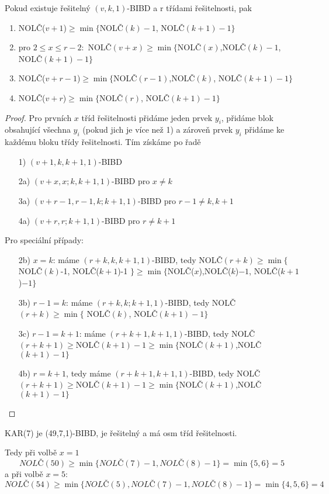\begin{theorem}
    Pokud existuje řešitelný $(v,k,1)$-BIBD a r třídami řešitelnosti, pak
    \begin{enumerate}
        \item NOLČ($v+1$)$\geq\min\{$NOLČ$(k)-1$, NOLČ$(k+1)-1\}$
        \item pro $2\leq x\leq r-2:$ NOLČ$(v+x)\geq\min\{$NOLČ$(x)$,NOLČ$(k)-1$, NOLČ$(k+1)-1\}$
        \item NOLČ($v+r-1$)$\geq\min\{$NOLČ$(r-1)$,NOLČ$(k)$, NOLČ$(k+1)-1\}$
        \item NOLČ($v+r$)$\geq\min\{$NOLČ$(r)$, NOLČ$(k+1)-1\}$
    \end{enumerate}
\end{theorem}
\begin{proof}
    Pro prvních $x$ tříd řešitelnosti přidáme jeden prvek $y_i$, přidáme blok obsahující všechna $y_i$ (pokud jich je více než 1) a zároveň prvek $y_i$ přidáme ke každému bloku  třídy řešitelnosti.
    Tím získáme po řadě
    \begin{itemize}
        \item[1)] $(v+1,k,k+1,1)$-BIBD
        \item[2a)] $(v+x,x;k,k+1,1)$-BIBD pro $x\neq k$
        \item[3a)] $(v+r-1, r-1, k;k+1,1)$-BIBD pro $r-1\neq k, k+1$
        \item[4a)] $(v+r, r; k+1, 1)$-BIBD pro $r\neq k+1$
    \end{itemize}
    Pro speciální případy:
    \begin{itemize}
        \item[2b)] $x=k$: máme $(r+k,k,k+1,1)$-BIBD, tedy NOLČ$(r+k)$$\geq\min\{$ NOLČ$(k)$-1, NOLČ($k+1$)-1 $\}\geq\min\{$NOLČ($x$),NOLČ($k$)$-1$, NOLČ($k+1$)$-1\}$
        \item[3b)] $r-1=k$: máme $(r+k, k;k+1,1)$-BIBD, tedy NOLČ$(r+k)\geq\min\{$ NOLČ$(k)$, NOLČ$(k+1)-1\}$
        \item[3c)] $r-1=k+1$: máme $(r+k+1,k+1,1)$-BIBD, tedy NOLČ$(r+k+1)\geq$NOLČ$(k+1)-1\geq\min\{$NOLČ$(k+1)$,NOLČ$(k+1)-1\}$
        \item[4b)] $r=k+1$, tedy máme $(r+k+1, k+1,1)$-BIBD, tedy NOLČ$(r+k+1)\geq$NOLČ$(k+1)-1\geq\min\{$NOLČ$(k+1)$,NOLČ$(k+1)-1\}$
    \end{itemize}
\end{proof}

\begin{example}
	KAR(7) je (49,7,1)-BIBD, je řešitelný a má osm tříd řešitelnosti.

	Tedy při volbě $x=1$
	\[ NOLČ(50) \geq \min \{ NOLČ(7)-1, NOLČ(8)-1 \} = \min \{5,6\} = 5 \]
	a při volbě $x=5$:
	\[ NOLČ(54) \geq \min \{ NOLČ(5), NOLČ(7)-1, NOLČ(8)-1 \} = \min \{4,5,6\} = 4\]
\end{example}


